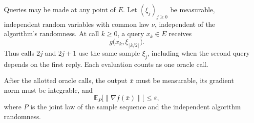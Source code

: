 \documentclass[10pt]{article}
\theoremstyle{definition}
\begin{document}
Queries may be made at any point of $E$. Let $(\xi_j)_{j\geq0}$ be measurable, independent random variables with common law $\nu$, independent of the algorithm's randomness. At call $k\geq0$, a query $x_k\in E$ receives
\[
g\bigl(x_k,\xi_{\lfloor k/2\rfloor}\bigr).
\]
Thus calls $2j$ and $2j+1$ use the same sample $\xi_j$, including when the second query depends on the first reply. Each evaluation counts as one oracle call.

After the allotted oracle calls, the output $\bar{x}$ must be measurable, its gradient norm must be integrable, and
\[
\mathbb{E}_{P}\bigl[\|\nabla f(\bar{x})\|\bigr]\leq\varepsilon,
\]
where $P$ is the joint law of the sample sequence and the independent algorithm randomness.
\end{document}
